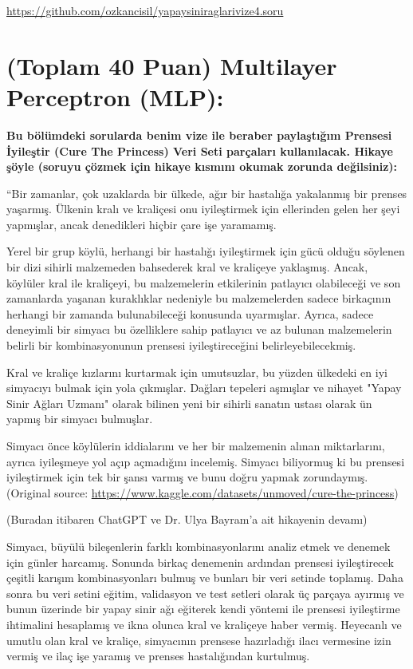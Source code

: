 \documentclass[11pt]{article}
\begin{document}
\url{https://github.com/ozkancisil/yapaysiniraglarivize4.soru}

\section{(Toplam 40 Puan) Multilayer Perceptron (MLP):} 
\textbf{Bu bölümdeki sorularda benim vize ile beraber paylaştığım Prensesi İyileştir (Cure The Princess) Veri Seti parçaları kullanılacak. Hikaye şöyle (soruyu çözmek için hikaye kısmını okumak zorunda değilsiniz):} 

``Bir zamanlar, çok uzaklarda bir ülkede, ağır bir hastalığa yakalanmış bir prenses yaşarmış. Ülkenin kralı ve kraliçesi onu iyileştirmek için ellerinden gelen her şeyi yapmışlar, ancak denedikleri hiçbir çare işe yaramamış.

Yerel bir grup köylü, herhangi bir hastalığı iyileştirmek için gücü olduğu söylenen bir dizi sihirli malzemeden bahsederek kral ve kraliçeye yaklaşmış. Ancak, köylüler kral ile kraliçeyi, bu malzemelerin etkilerinin patlayıcı olabileceği ve son zamanlarda yaşanan kuraklıklar nedeniyle bu malzemelerden sadece birkaçının herhangi bir zamanda bulunabileceği konusunda uyarmışlar. Ayrıca, sadece deneyimli bir simyacı bu özelliklere sahip patlayıcı ve az bulunan malzemelerin belirli bir kombinasyonunun prensesi iyileştireceğini belirleyebilecekmiş.

Kral ve kraliçe kızlarını kurtarmak için umutsuzlar, bu yüzden ülkedeki en iyi simyacıyı bulmak için yola çıkmışlar. Dağları tepeleri aşmışlar ve nihayet "Yapay Sinir Ağları Uzmanı" olarak bilinen yeni bir sihirli sanatın ustası olarak ün yapmış bir simyacı bulmuşlar.

Simyacı önce köylülerin iddialarını ve her bir malzemenin alınan miktarlarını, ayrıca iyileşmeye yol açıp açmadığını incelemiş. Simyacı biliyormuş ki bu prensesi iyileştirmek için tek bir şansı varmış ve bunu doğru yapmak zorundaymış. (Original source: \url{https://www.kaggle.com/datasets/unmoved/cure-the-princess})

(Buradan itibaren ChatGPT ve Dr. Ulya Bayram'a ait hikayenin devamı)

Simyacı, büyülü bileşenlerin farklı kombinasyonlarını analiz etmek ve denemek için günler harcamış. Sonunda birkaç denemenin ardından prensesi iyileştirecek çeşitli karışım kombinasyonları bulmuş ve bunları bir veri setinde toplamış. Daha sonra bu veri setini eğitim, validasyon ve test setleri olarak üç parçaya ayırmış ve bunun üzerinde bir yapay sinir ağı eğiterek kendi yöntemi ile prensesi iyileştirme ihtimalini hesaplamış ve ikna olunca kral ve kraliçeye haber vermiş. Heyecanlı ve umutlu olan kral ve kraliçe, simyacının prensese hazırladığı ilacı vermesine izin vermiş ve ilaç işe yaramış ve prenses hastalığından kurtulmuş.
\end{document}
